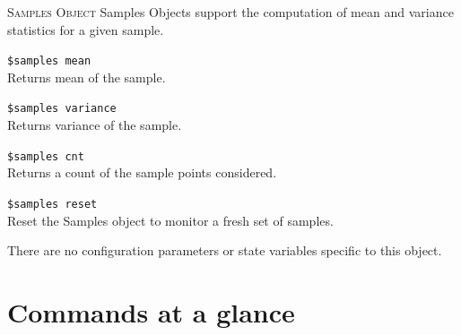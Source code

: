 \textsc{Samples Object}
Samples Objects support the computation of mean and variance statistics
for a given sample. 

{\tt \$samples mean}\\
Returns mean of the sample. 

{\tt \$samples variance}\\
Returns variance of the sample. 

{\tt \$samples cnt}\\
Returns a count of the sample points considered. 

{\tt \$samples reset }\\
Reset the Samples object to monitor a fresh set of samples. 

There are no configuration parameters or state variables specific to this
object. 



\section{Commands at a glance}
\label{sec:mathcommand}

